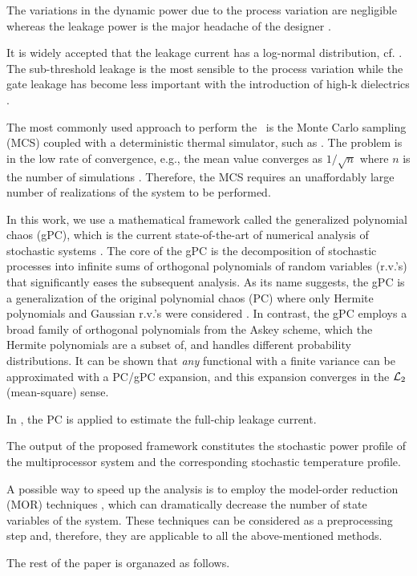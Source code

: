 The variations in the dynamic power due to the process variation are negligible whereas the leakage power is the major headache of the designer \cite{juan2012, srivastava2010}.

It is widely accepted that the leakage current has a log-normal distribution, cf. \cite{juan2012, srivastava2010}. The sub-threshold leakage is the most sensible to the process variation while the gate leakage has become less important with the introduction of high-k dielectrics \cite{juan2012}.

The most commonly used approach to perform the \sta\ is the Monte Carlo sampling (MCS) coupled with a deterministic thermal simulator, such as \cite{huang2006}. The problem is in the low rate of convergence, e.g., the mean value converges as $1/\sqrt{n}$ where $n$ is the number of simulations \cite{xiu2009}. Therefore, the MCS requires an unaffordably large number of realizations of the system to be performed.

In this work, we use a mathematical framework called the generalized polynomial chaos (gPC), which is the current state-of-the-art of numerical analysis of stochastic systems \cite{xiu2009, xiu2002}. The core of the gPC is the decomposition of stochastic processes into infinite sums of orthogonal polynomials of random variables (r.v.'s) that significantly eases the subsequent analysis. As its name suggests, the gPC is a generalization of the original polynomial chaos (PC) where only Hermite polynomials and Gaussian r.v.'s were considered \cite{ghanem1991}. In contrast, the gPC employs a broad family of orthogonal polynomials from the Askey scheme, which the Hermite polynomials are a subset of, and handles different probability distributions. It can be shown that \emph{any} functional with a finite variance can be approximated with a PC/gPC expansion, and this expansion converges in the $\mathcal{L}_{2}$ (mean-square) sense.

In \cite{shen2009}, the PC is applied to estimate the full-chip leakage current.

The output of the proposed framework constitutes the stochastic power profile of the multiprocessor system and the corresponding stochastic temperature profile.

A possible way to speed up the analysis is to employ the model-order reduction (MOR) techniques \cite{benner2011}, which can dramatically decrease the number of state variables of the system. These techniques can be considered as a preprocessing step and, therefore, they are applicable to all the above-mentioned methods.

The rest of the paper is organazed as follows.

